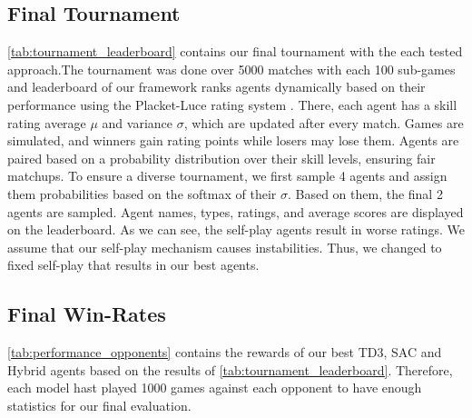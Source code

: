 \newpage
\subsection{Final Tournament} \label{sec:final-tournament}
\autoref{tab:tournament_leaderboard} contains our final tournament with the each tested approach.The tournament was done over 5000 matches with each 100 sub-games and leaderboard of our framework ranks agents dynamically based on their performance using the Placket-Luce rating system \cite{af5079a1-8ca5-3727-a405-0a82390327b7}. There, each agent has a skill rating average $\mu$ and variance $\sigma$, which are updated after every match. Games are simulated, and winners gain rating points while losers may lose them. Agents are paired based on a probability distribution over their skill levels, ensuring fair matchups. To ensure a diverse tournament, we first sample 4 agents and assign them probabilities based on the softmax of their $\sigma$. Based on them, the final 2 agents are sampled. Agent names, types, ratings, and average scores are displayed on the leaderboard. As we can see, the self-play agents result in worse ratings. We assume that our self-play mechanism causes instabilities. Thus, we changed to fixed self-play that results in our best agents.



\newpage
\subsection{Final Win-Rates} \label{sec:performance_opponents}
\autoref{tab:performance_opponents} contains the rewards of our best \ac{TD3}, \ac{SAC} and Hybrid agents based on the results of \autoref{tab:tournament_leaderboard}. Therefore, each model hast played 1000 games against each opponent to have enough statistics for our final evaluation.

